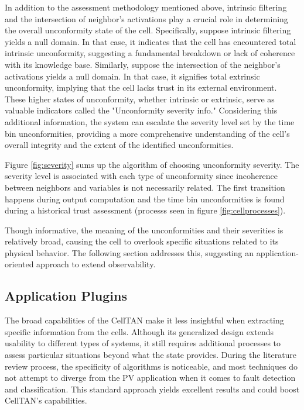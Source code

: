 In addition to the assessment methodology mentioned above, intrinsic filtering and the intersection of neighbor's activations play a crucial role in determining the overall unconformity state of the cell. Specifically, suppose intrinsic filtering yields a null domain. In that case, it indicates that the cell has encountered total intrinsic unconformity, suggesting a fundamental breakdown or lack of coherence with its knowledge base. Similarly, suppose the intersection of the neighbor's activations yields a null domain. In that case, it signifies total extrinsic unconformity, implying that the cell lacks trust in its external environment. These higher states of unconformity, whether intrinsic or extrinsic, serve as valuable indicators called the "Unconformity severity info." Considering this additional information, the system can escalate the severity level set by the time bin unconformities, providing a more comprehensive understanding of the cell's overall integrity and the extent of the identified unconformities.

Figure \ref{fig:severity} sums up the algorithm of choosing unconformity severity. The severity level is associated with each type of unconformity since incoherence between neighbors and variables is not necessarily related. The first transition happens during output computation and the time bin unconformities is found during a historical trust assessment (processs seen in figure \ref{fig:cellprocesses}).

Though informative, the meaning of the unconformities and their severities is relatively broad, causing the cell to overlook specific situations related to its physical behavior. The following section addresses this, suggesting an application-oriented approach to extend observability.

\subsection{Application Plugins} \label{subsec:plugins}


The broad capabilities of the CellTAN make it less insightful when extracting specific information from the cells. Although its generalized design extends usability to different types of systems, it still requires additional processes to assess particular situations beyond what the state provides. During the literature review process, the specificity of algorithms is noticeable, and most techniques do not attempt to diverge from the PV application when it comes to fault detection and classification. This standard approach yields excellent results and could boost CellTAN's capabilities.

